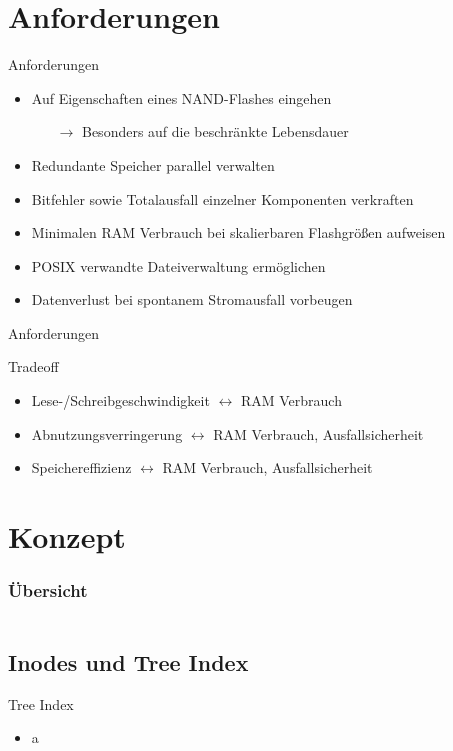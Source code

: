 \documentclass[
	,footlinenumber
	,navline=true
	,footlineauthor
	,ngerman
	]{beamer}
\newcommand{\zwischenUebersicht}
{
   \begin{frame}
        \frametitle{\"Ubersicht}
	\note{
        \tableofcontents[ 
    		currentsubsection, 
		hideothersubsections,
   		sectionstyle=show/hide, 
		] 
	}
	\begin{columns}[t]
        \begin{column}{.5\textwidth}
            \tableofcontents[subsectionstyle=show,hideothersubsections,sectionstyle=show/shaded,sections={1-3}]
        \end{column}
        \begin{column}{.5\textwidth}
            \tableofcontents[subsectionstyle=show,hideothersubsections,sectionstyle=show/shaded,sections={4-}]
        \end{column}
    \end{columns}
   \end{frame}
}
\begin{document}
\section{Anforderungen}
\begin{frame}{Anforderungen}
	\begin{block}{}
		\begin{itemize}
			\item Auf Eigenschaften eines NAND-Flashes eingehen
			\begin{itemize}
				\item[$\rightarrow$] Besonders auf die beschränkte Lebensdauer
			\end{itemize}
			\item Redundante Speicher parallel verwalten
			\item Bitfehler sowie Totalausfall einzelner Komponenten verkraften
			\item Minimalen RAM Verbrauch bei skalierbaren Flashgrößen aufweisen
			\item POSIX verwandte Dateiverwaltung ermöglichen
			\item Datenverlust bei spontanem Stromausfall vorbeugen
		\end{itemize}
	\end{block}
\end{frame}

\begin{frame}{Anforderungen}
	\begin{block}{Tradeoff}
		\begin{itemize}
			\item Lese-/Schreibgeschwindigkeit $\longleftrightarrow$ RAM Verbrauch
			\item Abnutzungsverringerung $\longleftrightarrow$ RAM Verbrauch, Ausfallsicherheit
			\item Speichereffizienz $\longleftrightarrow$ RAM Verbrauch, Ausfallsicherheit
		\end{itemize}
	\end{block}
\end{frame}


\section{Konzept}
\zwischenUebersicht
\subsection{Inodes und Tree Index}
\begin{frame}{Tree Index}
	\begin{block}{}
		\begin{itemize}
			\item a
		\end{itemize}
	\end{block}
\end{frame}
\end{document}
